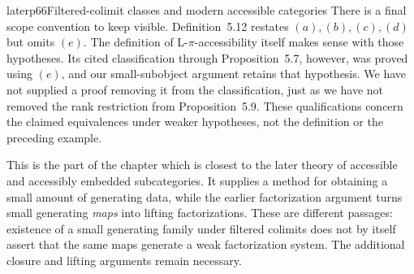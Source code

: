 \begin{dcomment}{later}{p66}{Filtered-colimit classes and modern accessible categories}
There is a final scope convention to keep visible. Definition~5.12 restates $(a),(b),(c),(d)$ but omits $(e)$. The definition of L-$\pi$-accessibility itself makes sense with those hypotheses. Its cited classification through Proposition~5.7, however, was proved using $(e)$, and our small-subobject argument retains that hypothesis. We have not supplied a proof removing it from the classification, just as we have not removed the rank restriction from Proposition~5.9. These qualifications concern the claimed equivalences under weaker hypotheses, not the definition or the preceding example.

This is the part of the chapter which is closest to the later theory of accessible and accessibly embedded subcategories. It supplies a method for obtaining a small amount of generating data, while the earlier factorization argument turns small generating \emph{maps} into lifting factorizations. These are different passages: existence of a small generating family under filtered colimits does not by itself assert that the same maps generate a weak factorization system. The additional closure and lifting arguments remain necessary.
\end{dcomment}

